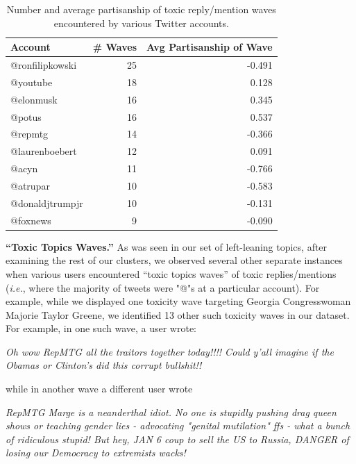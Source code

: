 \begin{table}
\centering
\small
\begin{tabular}{l|rr}
\textbf{Account} &\textbf{\# Waves } & \textbf{Avg Partisanship of Wave } \\\midrule
@ronfilipkowski & 25  & -0.491\\
@youtube & 18 & 0.128\\
@elonmusk & 16 & 0.345 \\
@potus & 16 & 0.537\\
@repmtg & 14 & -0.366\\
@laurenboebert & 12 & 0.091\\
@acyn & 11& -0.766\\
@atrupar & 10 &-0.583\\
@donaldjtrumpjr & 10 & -0.131\\
@foxnews & 9 & -0.090\\
\bottomrule

\end{tabular}
\caption{\label{tab:campaigns} Number and average partisanship of toxic reply/mention waves encountered by various Twitter accounts.} 
\vspace{-15pt}
\end{table}
\vspace{2pt}
\noindent
\textbf{``Toxic Topics Waves.''} As was seen in our set of left-leaning topics, after examining the rest of our clusters, we observed several other separate instances when various users encountered ``toxic topics waves'' of toxic replies/mentions (\textit{i.e.}, where the majority of tweets were "@"s at a particular account).  For example, while we displayed one toxicity wave targeting Georgia Congresswoman Majorie Taylor Greene, we identified 13 other such toxicity waves in our dataset. For example, in one such wave, a user wrote:
\begin{displayquote}
\small
\textit{Oh wow RepMTG all the traitors together today!!!!  Could y'all imagine if the Obamas or Clinton's did this corrupt bullshit!!}
\end{displayquote}
while in another wave a different user wrote
\begin{displayquote}
\small
\textit{RepMTG Marge is a neanderthal idiot. No one is stupidly pushing drag queen shows or teaching gender lies - advocating "genital mutilation" ffs - what a bunch of ridiculous stupid! But hey, JAN 6 coup to sell the US to Russia, DANGER of losing our Democracy to extremists wacks!}
\end{displayquote}

